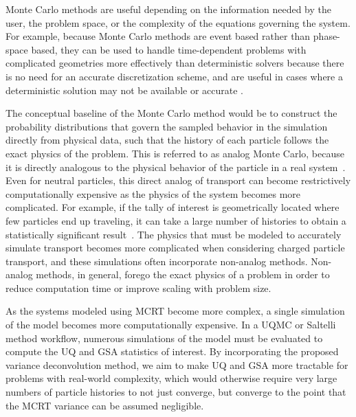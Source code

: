 Monte Carlo methods are useful depending on the information needed by the user, the problem space, or the complexity of the equations governing the system. For example, because Monte Carlo methods are event based rather than phase-space based, they can be used to handle time-dependent problems with complicated geometries more effectively than deterministic solvers because there is no need for an accurate discretization scheme, and are useful in cases where a deterministic solution may not be available or accurate \cite{mcnp}. 

The conceptual baseline of the Monte Carlo method would be to construct the probability distributions that govern the sampled behavior in the simulation directly from physical data, such that the history of each particle follows the exact physics of the problem. This is referred to as analog Monte Carlo, because it is directly analogous to the physical behavior of the particle in a real system~\cite{mcnp}. Even for neutral particles, this direct analog of transport can become restrictively computationally expensive as the physics of the system becomes more complicated. For example, if the tally of interest is geometrically located where few particles end up traveling, it can take a large number of histories to obtain a statistically significant result~\cite{mcnp}. The physics that must be modeled to accurately simulate transport becomes more complicated when considering charged particle transport, and these simulations often incorporate non-analog methods. Non-analog methods, in general, forego the exact physics of a problem in order to reduce computation time or improve scaling with problem size. 

As the systems modeled using MCRT become more complex, a single simulation of the model becomes more computationally expensive. In a UQMC or Saltelli method workflow, numerous simulations of the model must be evaluated to compute the UQ and GSA statistics of interest. By incorporating the proposed variance deconvolution method, we aim to make UQ and GSA more tractable for problems with real-world complexity, which would otherwise require very large numbers of particle histories to not just converge, but converge to the point that the MCRT variance can be assumed negligible.

